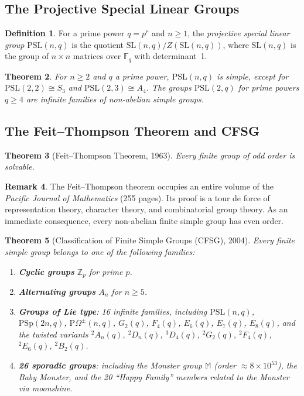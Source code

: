\documentclass[12pt,a4paper]{amsart}
\newtheorem{theorem}{Theorem}[section]
\theoremstyle{definition}
\newtheorem{definition}[theorem]{Definition}
\newtheorem{remark}[theorem]{Remark}
\begin{document}
\subsection{The Projective Special Linear Groups}

\begin{definition}
For a prime power $q = p^r$ and $n \geq 1$, the \emph{projective special linear group}
$\mathrm{PSL}(n, q)$ is the quotient $\mathrm{SL}(n, q) / Z(\mathrm{SL}(n,q))$, where
$\mathrm{SL}(n,q)$ is the group of $n \times n$ matrices over $\mathbb{F}_q$ with
determinant~1.
\end{definition}

\begin{theorem}
For $n \geq 2$ and $q$ a prime power, $\mathrm{PSL}(n, q)$ is simple, except for
$\mathrm{PSL}(2, 2) \cong S_3$ and $\mathrm{PSL}(2, 3) \cong A_4$.
The groups $\mathrm{PSL}(2, q)$ for prime powers $q \geq 4$ are infinite families of
non-abelian simple groups.
\end{theorem}

\subsection{The Feit--Thompson Theorem and CFSG}

\begin{theorem}[Feit--Thompson Theorem, 1963]
\label{thm:feit_thompson}
Every finite group of odd order is solvable.
\end{theorem}

\begin{remark}
The Feit--Thompson theorem occupies an entire volume of the \emph{Pacific Journal of
Mathematics} (255 pages). Its proof is a tour de force of representation theory,
character theory, and combinatorial group theory. As an immediate consequence, every
non-abelian finite simple group has even order.
\end{remark}

\begin{theorem}[Classification of Finite Simple Groups (CFSG), 2004]
\label{thm:cfsg}
Every finite simple group belongs to one of the following families:
\begin{enumerate}[label=(\roman*)]
  \item \textbf{Cyclic groups} $\mathbb{Z}_p$ for prime $p$.
  \item \textbf{Alternating groups} $A_n$ for $n \geq 5$.
  \item \textbf{Groups of Lie type}: 16 infinite families, including
        $\mathrm{PSL}(n,q)$, $\mathrm{PSp}(2n,q)$, $\mathrm{P}\Omega^{\pm}(n,q)$,
        $G_2(q)$, $F_4(q)$, $E_6(q)$, $E_7(q)$, $E_8(q)$, and the twisted variants
        ${}^2A_n(q)$, ${}^2D_n(q)$, ${}^3D_4(q)$, ${}^2G_2(q)$, ${}^2F_4(q)$,
        ${}^2E_6(q)$, ${}^2B_2(q)$.
  \item \textbf{26 sporadic groups}: including the Monster group $\mathbb{M}$
        (order $\approx 8 \times 10^{53}$), the Baby Monster, and the 20
        ``Happy Family'' members related to the Monster via moonshine.
\end{enumerate}
\end{theorem}
\end{document}
